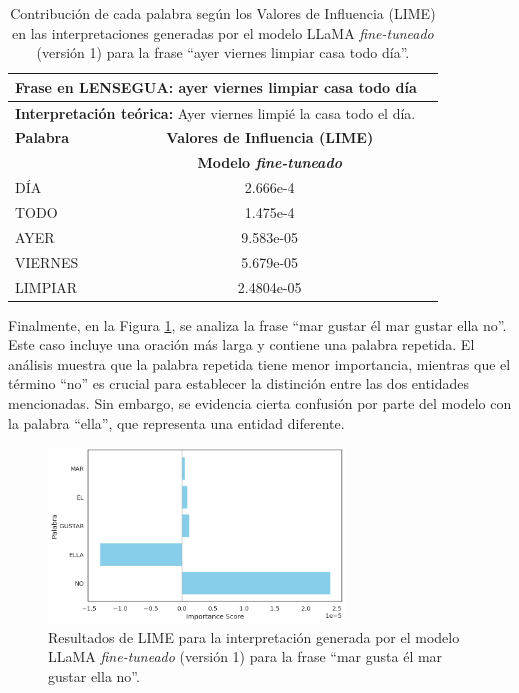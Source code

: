 \vspace{0.5cm}
\begin{table}[H]
\centering
    \begin{tabular}{|l|c|c|}
        \hline
        \multicolumn{2}{|l|}{\textbf{Frase en LENSEGUA:} ayer viernes limpiar casa todo día} \\ \hline
        \multicolumn{2}{|l|}{\textbf{Interpretación teórica:} Ayer viernes limpié la casa todo el día.} \\ \hline \hline
        
        \textbf{Palabra} & \multicolumn{1}{c|}{\textbf{Valores de Influencia (LIME)}} \\ 
        \cline{3-0} & \textbf{Modelo \textit{fine-tuneado}} \\
         
        \hline
        DÍA & 2.666e-4  \\ 
        \hline
        TODO & 1.475e-4 \\
        \hline
        AYER & 9.583e-05 \\
        \hline
        VIERNES & 5.679e-05\\
        \hline 
        LIMPIAR & 2.4804e-05\\
        \hline
        
    \end{tabular}
\caption{Contribución de cada palabra según los Valores de Influencia (LIME) en las interpretaciones generadas por el modelo LLaMA \textit{fine-tuneado} (versión 1) para la frase “ayer viernes limpiar casa todo día”.}
\label{tab:LIME1-LLAMA2}
\end{table}


Finalmente, en la Figura \ref{fig:LIME1-LLAMA3}, se analiza la frase “mar gustar él mar gustar ella no”. Este caso incluye una oración más larga y contiene una palabra repetida. El análisis muestra que la palabra repetida tiene menor importancia, mientras que el término “no” es crucial para establecer la distinción entre las dos entidades mencionadas. Sin embargo, se evidencia cierta confusión por parte del modelo con la palabra “ella”, que representa una entidad diferente.



\begin{figure}[H]
\centering
    \includegraphics[width=0.7\textwidth]{figuras/Oracion3.png}
    \caption{Resultados de LIME para la interpretación generada por el modelo LLaMA \textit{fine-tuneado} (versión 1) para la frase “mar gusta él mar gustar ella no”.}
    \label{fig:LIME1-LLAMA3}
\end{figure}


